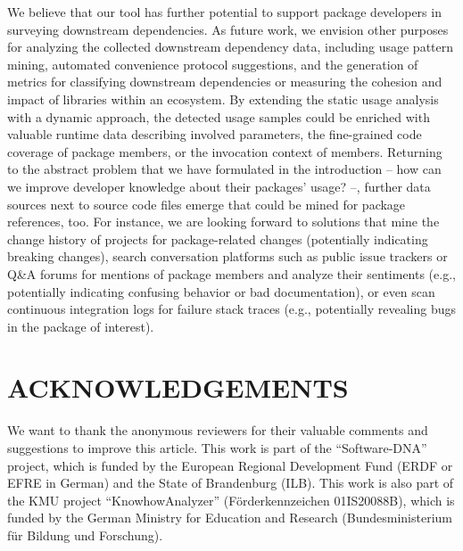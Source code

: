 \documentclass[a4paper,twoside]{article}
\begin{document}
We believe that our tool has further potential to support package developers in surveying downstream dependencies.
As future work, we envision other purposes for analyzing the collected downstream dependency data, including usage pattern mining, automated convenience protocol suggestions, and the generation of metrics for classifying downstream dependencies or measuring the cohesion and impact of libraries within an ecosystem.
By extending the static usage analysis with a dynamic approach, the detected usage samples could be enriched with valuable runtime data describing involved parameters, the fine-grained code coverage of package members, or the invocation context of members.
Returning to the abstract problem that we have formulated in the introduction -- how can we improve developer knowledge about their packages' usage? --, further data sources next to source code files emerge that could be mined for package references, too.
For instance, we are looking forward to solutions that mine the change history of projects for package-related changes (potentially indicating breaking changes), search conversation platforms such as public issue trackers or Q\&A forums for mentions of package members and analyze their sentiments (e.g., potentially indicating confusing behavior or bad documentation), or even scan continuous integration logs for failure stack traces (e.g., potentially revealing bugs in the package of interest).

\section*{\uppercase{Acknowledgements}}

We want to thank the anonymous reviewers for their valuable comments and suggestions to improve this article.
This work is part of the \enquote{Software-DNA} project, which is funded by the European Regional Development Fund (ERDF or EFRE in German) and the State of Brandenburg (ILB).
This work is also part of the KMU project \enquote{KnowhowAnalyzer} (Förderkennzeichen 01IS20088B), which is funded by the German Ministry for Education and Research (Bundesministerium für Bildung und Forschung).


{\small%
}
\end{document}
